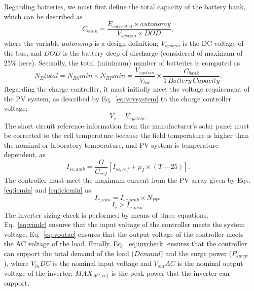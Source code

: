 \documentclass[10pt,conference]{IEEEtran}
\begin{document}
%
Regarding batteries, we must first define the total capacity of the battery bank, which can be described as
\begin{equation}
\label{eq:Cbank}
\scriptstyle C_{bank} \scriptstyle = \dfrac{\scriptstyle E_{corrected} \scriptstyle \times \scriptstyle autonomy}{\scriptstyle V_{system} \scriptstyle \times \scriptstyle DOD},
\end{equation}
%
\noindent where the variable $autonomy$ is a design definition; %
$ V_{system} $ is the DC voltage of the bus, and $ DOD $ is the battery deep of discharge (considered of maximum of 25\% here).
%
Secondly, the total (minimum) number of batteries is computed as 
\begin{equation}
\label{eq:Nbtotal}
\scriptstyle N_{B}total = \scriptstyle N_{BS}min \scriptstyle \times \scriptstyle N_{BP}min = \dfrac{\scriptstyle V_{system}}{\scriptstyle V_{bat}} \scriptstyle \times \dfrac{\scriptstyle C_{bank}}{\scriptstyle 1 \,Battery \, Capacity}.
\end{equation}
%
Regarding the charge controller, it must initially meet the voltage requirement of the PV system, as described by Eq.~\eqref{eq:vcvsystem} to the charge controller voltage: 
\begin{equation}
\label{eq:vcvsystem}
\scriptstyle V_{c} = \scriptstyle V_{system}.
\end{equation}
%
The short circuit reference information from the manufacturer's solar panel must be corrected to the cell temperature because the field temperature is higher than the nominal or laboratory temperature, and PV system is temperature dependent, as 
%
\begin{equation}
\label{eq:iscamb}
\scriptstyle I_{sc,amb} = \dfrac{\scriptstyle G}{\scriptstyle G_{ref}} \left[ \scriptstyle I_{sc,ref} + \scriptstyle \mu_{I} \scriptstyle \times \scriptstyle (T-25) \right]. 
\end{equation}
%
The controller must meet the maximum current from the PV array given by Eqs. \eqref{eq:icmin} and \eqref{eq:icicmin} as
\begin{equation}
\label{eq:icmin}
\scriptstyle I_{c,min} = \scriptstyle I_{sc,amb} \times \scriptstyle N_{PP},
\end{equation}
%
\begin{equation}
\label{eq:icicmin}
\scriptstyle I_{c} \geq \scriptstyle I_{c,min}.
\end{equation}
%
The inverter sizing check is performed by means of three equations. Eq.~\eqref{eq:vindc} ensures that the input voltage of the controller meets the system voltage. Eq.~\eqref{eq:voutac} ensures that the output voltage of the controller meets the AC voltage of the load. Finally, Eq.~\eqref{eq:invcheck} ensures that the controller can support the total demand of the load ($Demand$) and the surge power ($P_{surge}$), where $V_{in}DC$ is the nominal input voltage and $V_{out}AC$ is the nominal output voltage of the inverter; $MAX_{AC,ref}$ is the peak power that the inverter can support.
\end{document}
